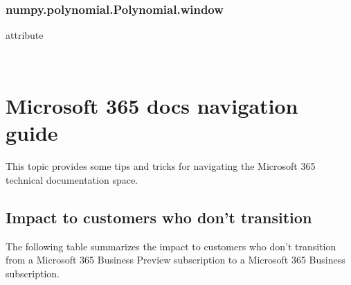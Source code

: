 \documentclass[letterpaper,10pt,english]{sphinxmanual}
\begin{document}
\begin{fulllineitems}
\begin{fulllineitems}
\label{\detokenize{generated/generated/numpy.polynomial.Polynomial.nickname:numpy.polynomial.Polynomial.nickname}}~
\end{fulllineitems}



\subsection{numpy.polynomial.Polynomial.window}
\label{\detokenize{generated/generated/numpy.polynomial.Polynomial.window:numpy-polynomial-polynomial-window}}\label{\detokenize{generated/generated/numpy.polynomial.Polynomial.window::doc}}
attribute

\begin{fulllineitems}
\label{\detokenize{generated/generated/numpy.polynomial.Polynomial.window:numpy.polynomial.Polynomial.window}}~
\end{fulllineitems}


\end{fulllineitems}



\chapter{Microsoft 365 docs navigation guide}
\label{\detokenize{markdown:microsoft-365-docs-navigation-guide}}\label{\detokenize{markdown::doc}}
This topic provides some tips and tricks for navigating the Microsoft 365 technical documentation space.


\section{Impact to customers who don’t transition}
\label{\detokenize{markdown:impact-to-customers-who-don-t-transition}}
The following table summarizes the impact to customers who don’t transition from a Microsoft 365 Business Preview subscription to a Microsoft 365 Business subscription.
\end{document}
